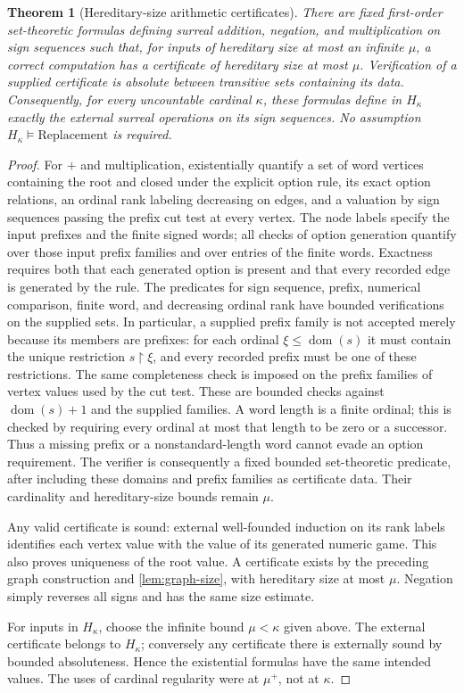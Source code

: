 \documentclass[11pt,letterpaper]{article}
\newtheorem{theorem}{Theorem}[section]
\theoremstyle{definition}
\theoremstyle{remark}
\newcommand{\dom}{\operatorname{dom}}
\begin{document}
\begin{theorem}[Hereditary-size arithmetic certificates]
\label{thm:certificates}
There are fixed first-order set-theoretic formulas defining surreal addition,
negation, and multiplication on sign sequences such that, for inputs of
hereditary size at most an infinite $\mu$, a correct computation has a
certificate of hereditary size at most $\mu$. Verification of a supplied
certificate is absolute between transitive sets containing its data.
Consequently, for every uncountable cardinal $\kappa$, these formulas define
in $H_\kappa$ exactly the external surreal operations on its sign sequences.
No assumption $H_\kappa\models\mathrm{Replacement}$ is required.
\end{theorem}
\begin{proof}
For $+$ and multiplication, existentially quantify a set of word vertices
containing the root and closed under the explicit option rule, its exact
option relations, an ordinal rank labeling decreasing on edges, and a
valuation by sign sequences passing the prefix cut test at every vertex.
The node labels specify the input prefixes and the finite signed words; all
checks of option generation quantify over those input prefix families and
over entries of the finite words. Exactness requires both that each generated
option is present and that every recorded edge is generated by the rule.
The predicates for sign sequence, prefix, numerical comparison, finite word,
and decreasing ordinal rank have bounded verifications on the supplied
sets. In particular, a supplied prefix family is not accepted merely because
its members are prefixes: for each ordinal $\xi\le\dom(s)$ it must contain
the unique restriction $s\mathbin{\upharpoonright}\xi$, and every recorded
prefix must be one of these restrictions. The same completeness check is
imposed on the prefix families of vertex values used by the cut test.
These are bounded checks against $\dom(s)+1$ and the supplied families.
A word length is a finite ordinal; this is checked by requiring every
ordinal at most that length to be zero or a successor. Thus a missing
prefix or a nonstandard-length word cannot evade an option requirement.
The verifier is consequently a fixed bounded set-theoretic predicate,
after including these domains and prefix families as certificate data.
Their cardinality and hereditary-size bounds remain $\mu$.

Any valid certificate is sound: external well-founded induction on its
rank labels identifies each vertex value with the value of its generated
numeric game. This also proves uniqueness of the root value. A certificate
exists by the preceding graph construction and \cref{lem:graph-size}, with
hereditary size at most $\mu$. Negation simply reverses all signs and has the
same size estimate.

For inputs in $H_\kappa$, choose the infinite bound $\mu<\kappa$ given above.
The external certificate belongs to $H_\kappa$; conversely any certificate
there is externally sound by bounded absoluteness. Hence the existential
formulas have the same intended values. The uses of cardinal regularity were
at $\mu^+$, not at $\kappa$.
\end{proof}
\end{document}
